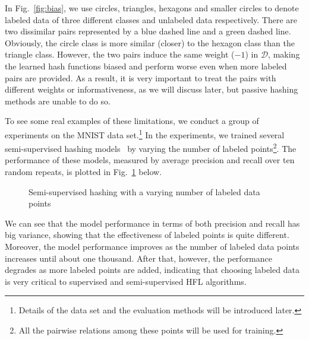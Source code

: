 In Fig.~\ref{fig:bias}, we use circles, triangles, hexagons and smaller circles to denote labeled data of three different classes and unlabeled data respectively. There are two dissimilar pairs represented by a blue dashed line and a green dashed line. Obviously, the circle class is more similar (closer) to the hexagon class than the triangle class.  However, the two pairs induce the same weight ($-1$) in $\mathcal{D}$, making the learned hash functions biased and perform worse even when more labeled pairs are provided. As a result, it is very important to treat the pairs with different weights or informativeness, as we will discuss later, but passive hashing methods are unable to do so. 


To see some real examples of these limitations, we conduct a group of experiments on the \mbox{MNIST} data set.\footnote{Details of the data set and the evaluation methods will be introduced later.} In the experiments, we trained several semi-supervised hashing models~\cite{wang2010cvpr} by varying the number of labeled points\footnote{All the pairwise relations among these points will be used for training.}. The performance of these models, measured by average precision and recall over ten random repeats, is plotted in Fig.~\ref{fig:ah:demo-randompoint} below.

\begin{figure}[ht]
\vspace{-1.5cm}
\caption{Semi-supervised hashing with a varying number of labeled data points}
\label{fig:ah:demo-randompoint} %
\end{figure}

We can see that the model performance in terms of both precision and recall has big variance, showing that the effectiveness of labeled points is quite different. Moreover, the model performance improves as the number of labeled data points increases until about one thousand. After that, however, the performance degrades as more labeled points are added, indicating that choosing labeled data is very critical to supervised and semi-supervised \mbox{HFL} algorithms. 

